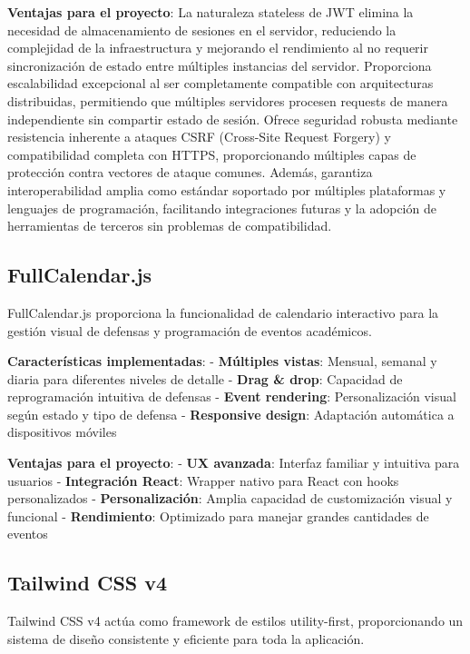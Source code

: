 \documentclass[12pt,a4paper,oneside]{report}
\begin{document}
\textbf{Ventajas para el proyecto}: La naturaleza stateless de JWT elimina la necesidad de almacenamiento de sesiones en el servidor, reduciendo la complejidad de la infraestructura y mejorando el rendimiento al no requerir sincronización de estado entre múltiples instancias del servidor. Proporciona escalabilidad excepcional al ser completamente compatible con arquitecturas distribuidas, permitiendo que múltiples servidores procesen requests de manera independiente sin compartir estado de sesión. Ofrece seguridad robusta mediante resistencia inherente a ataques CSRF (Cross-Site Request Forgery) y compatibilidad completa con HTTPS, proporcionando múltiples capas de protección contra vectores de ataque comunes. Además, garantiza interoperabilidad amplia como estándar soportado por múltiples plataformas y lenguajes de programación, facilitando integraciones futuras y la adopción de herramientas de terceros sin problemas de compatibilidad.

\subsection{FullCalendar.js}\label{fullcalendar.js}

FullCalendar.js proporciona la funcionalidad de calendario interactivo
para la gestión visual de defensas y programación de eventos
académicos.

\textbf{Características implementadas}: - \textbf{Múltiples vistas}:
Mensual, semanal y diaria para diferentes niveles de detalle -
\textbf{Drag \& drop}: Capacidad de reprogramación intuitiva de defensas
- \textbf{Event rendering}: Personalización visual según estado y tipo
de defensa - \textbf{Responsive design}: Adaptación automática a
dispositivos móviles

\textbf{Ventajas para el proyecto}: - \textbf{UX avanzada}: Interfaz
familiar y intuitiva para usuarios - \textbf{Integración React}: Wrapper
nativo para React con hooks personalizados - \textbf{Personalización}:
Amplia capacidad de customización visual y funcional -
\textbf{Rendimiento}: Optimizado para manejar grandes cantidades de
eventos

\subsection{Tailwind CSS v4}\label{tailwind-css-v4}

Tailwind CSS v4 actúa como framework de estilos utility-first,
proporcionando un sistema de diseño consistente y eficiente para toda la
aplicación.
\end{document}
